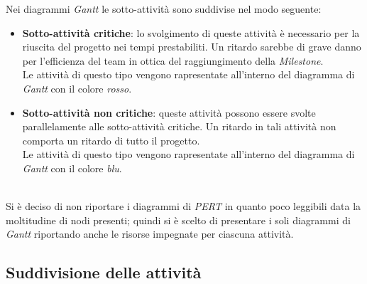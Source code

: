 Nei diagrammi \textit{Gantt} le sotto-attività sono suddivise nel modo seguente:
\begin{itemize}
	\item \textbf{Sotto-attività critiche}: lo svolgimento di queste attività è necessario per la riuscita del progetto nei tempi prestabiliti. Un ritardo sarebbe di grave danno per l'efficienza del team in ottica del raggiungimento della \textit{Milestone}. \\ 
	Le attività di questo tipo vengono rapresentate all'interno del diagramma di \textit{Gantt} con il colore \textit{rosso}.
	\item \textbf{Sotto-attività non critiche}: queste attività possono essere svolte parallelamente alle sotto-attività critiche. Un ritardo in tali attività non comporta un ritardo di tutto il progetto. \\
	Le attività di questo tipo vengono rapresentate all'interno del diagramma di \textit{Gantt} con il colore \textit{blu}.
\end{itemize}
\\
Si è deciso di non riportare i diagrammi di \textit{PERT} in quanto poco leggibili data la moltitudine
di nodi presenti; quindi si è scelto di presentare i soli diagrammi di \textit{Gantt} riportando anche le
risorse impegnate per ciascuna attività.\\

\subsection{Suddivisione delle attività}

